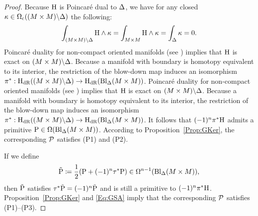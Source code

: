 \documentclass[\MainFolder/Text.tex]{subfiles}
\begin{document}
\begin{proof}
Because $\mathrm{H}$ is Poincar\'e dual to $\Delta$, we have for any closed $\kappa \in \Omega_{\mathrm{c}}((M\times M)\backslash \Delta)$ the following:
\[ \int_{(M\times M)\backslash \Delta} \mathrm{H} \wedge \kappa = \int_{M\times M} \mathrm{H} \wedge \kappa = \int_{\Delta} \kappa = 0. \]
Poincar\'e duality for non-compact oriented manifolds (see \cite{BottTu1982}) implies that $\mathrm{H}$ is exact on $(M\times M)\backslash \Delta$.
Because a manifold with boundary is homotopy equivalent to its interior,  the restriction of the blow-down map induces an isomorphism $\pi^* : \mathrm{H}_{\mathrm{dR}}((M\times M)\backslash \Delta) \rightarrow \mathrm{H}_{\mathrm{dR}}(\mathrm{Bl}_{\Delta}(M\times M))$.
Poincar\'e duality for non-compact oriented manifolds (see \cite{BottTu1982}) implies that $\mathrm{H}$ is exact on $(M\times M)\backslash \Delta$. Because a manifold with boundary is homotopy equivalent to its interior,  the restriction of the blow-down map induces an isomorphism $\pi^* : \mathrm{H}_{\mathrm{dR}}((M\times M)\backslash \Delta) \rightarrow \mathrm{H}_{\mathrm{dR}}(\mathrm{Bl}_{\Delta}(M\times M))$. It follows that $(-1)^n \pi^* \mathrm{H}$ admits a primitive $\mathrm{P} \in \Omega(\mathrm{Bl}_{\Delta}(M\times M))$. According to Proposition~\ref{Prop:GKer}, the corresponding $\mathcal{P}$ satisfies (P1) and (P2).

If we define
\[ \tilde{\mathrm{P}} \coloneqq \frac{1}{2}(\mathrm{P} + (-1)^n \tau^* \mathrm{P})\in \Omega^{n-1}(\mathrm{Bl}_{\Delta}(M\times M)), \]
then $\tilde{\mathrm{P}}$ satisfies $\tau^* \tilde{\mathrm{P}} = (-1)^n \tilde{\mathrm{P}}$ and is still a primitive to $(-1)^n \pi^* \mathrm{H}$. Proposition~\ref{Prop:GKer} and \eqref{Eq:GSA} imply that the corresponding $\mathcal{P}$ satisfies (P1)--(P3).


\end{proof}
\end{document}
